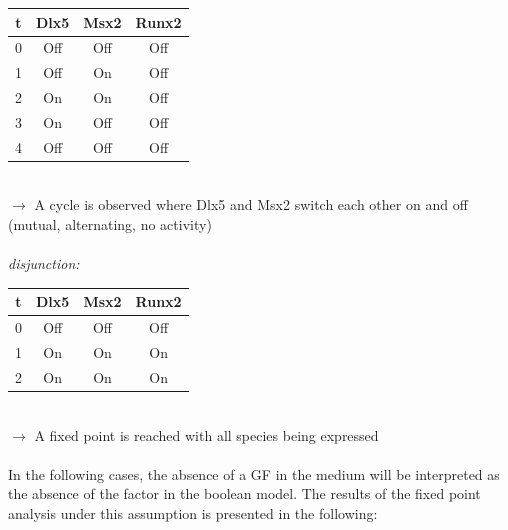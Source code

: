\documentclass[11pt]{article}
\begin{document}
\begin{appendices}
\begin{tabular}{c c c c}
t & Dlx5 & Msx2 & Runx2 \\
\hline
0 & Off & Off & Off \\
1 & Off & On & Off \\
2 & On & On & Off \\
3 & On & Off & Off \\
4 & Off & Off & Off
\end{tabular}
\\
$\rightarrow$ A cycle is observed where Dlx5 and Msx2 switch each other on and off (mutual, alternating, no activity)
\\ \\
\textit{disjunction:}
\\ 
\begin{tabular}{c c c c}
t & Dlx5 & Msx2 & Runx2 \\
\hline
0 & Off & Off & Off \\
1 & On & On & On \\
2 & On & On & On
\end{tabular}
\\
$\rightarrow$ A fixed point is reached with all species being expressed
\\ \\

In the following cases, the absence of a GF in the medium will be interpreted as the absence of the factor in the boolean model. The results of the fixed point analysis under this assumption is presented in the following:


\end{appendices}
\end{document}
